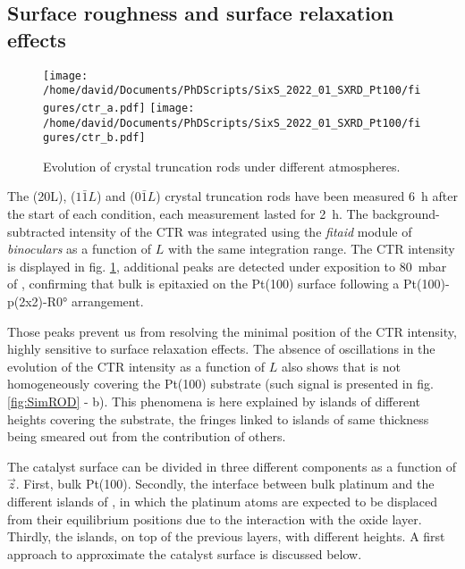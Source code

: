 \subsection{Surface roughness and surface relaxation effects}

\begin{figure}[!htb]
    \centering
    \texttt{[image: /home/david/Documents/PhDScripts/SixS\_2022\_01\_SXRD\_Pt100/figures/ctr\_a.pdf]}
    \texttt{[image: /home/david/Documents/PhDScripts/SixS\_2022\_01\_SXRD\_Pt100/figures/ctr\_b.pdf]}
    \caption{
        Evolution of crystal truncation rods under different atmospheres.
    }
    \label{fig:CTRPt100}
\end{figure}

The (20L), ($1\bar{1}L$) and (0$\bar{1}L$) crystal truncation rods have been measured \qty{6}{\hour} after the start of each condition, each measurement lasted for \qty{2}{\hour}.
The background-subtracted intensity of the CTR was integrated using the \textit{fitaid} module of \textit{binoculars} as a function of $L$ with the same integration range.
The CTR intensity is displayed in fig. \ref{fig:CTRPt100}, additional peaks are detected under exposition to \qty{80}{\milli\bar} of , confirming that bulk  is epitaxied on the Pt(100) surface following a Pt(100)-p(2x2)-R\ang{0} arrangement.

Those peaks prevent us from resolving the minimal position of the CTR intensity, highly sensitive to surface relaxation effects.
The absence of oscillations in the evolution of the CTR intensity as a function of $L$ also shows that  is not homogeneously covering the Pt(100) substrate (such signal is presented in fig. \ref{fig:SimROD} - b).
This phenomena is here explained by  islands of different heights covering the substrate, the fringes linked to islands of same thickness being smeared out from the contribution of others.

The catalyst surface can be divided in three different components as a function of $\vec{z}$.
First, bulk Pt(100).
Secondly, the interface between bulk platinum and the different islands of , in which the platinum atoms are expected to be displaced from their equilibrium positions due to the interaction with the oxide layer.
Thirdly, the  islands, on top of the previous layers, with different heights.
A first approach to approximate the catalyst surface is discussed below.

